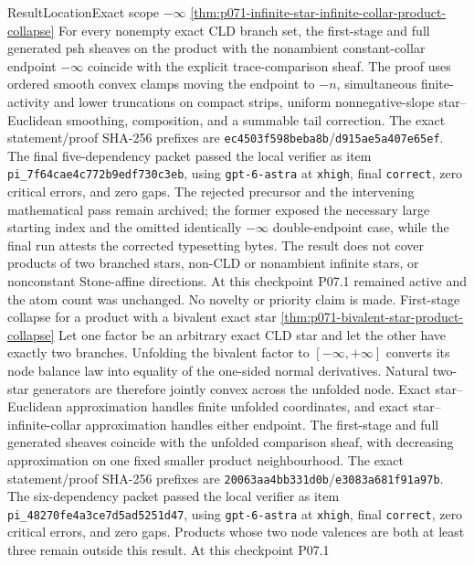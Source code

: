 \begin{AppLProvenanceLedger}{Result}{Location}{Exact scope}
{   \(-\infty\)}
  {\cref{thm:p071-infinite-star-infinite-collar-product-collapse}}
  {For every nonempty exact CLD branch set, the first-stage and full
   generated psh sheaves on the product with the nonambient
   constant-collar endpoint \(-\infty\) coincide with the explicit
   trace-comparison sheaf.  The proof uses ordered smooth convex clamps
   moving the endpoint to \(-n\), simultaneous finite-activity and lower
   truncations on compact strips, uniform nonnegative-slope
   star--Euclidean smoothing, composition, and a summable tail correction.
   The exact statement/proof SHA-256 prefixes are
   \texttt{ec4503f598beba8b}/\texttt{d915ae5a407e65ef}.  The final
   five-dependency packet passed the local verifier as item
   \nolinkurl{pi_7f64cae4c772b9edf730c3eb}, using
   \texttt{gpt-6-astra} at \texttt{xhigh}, final \texttt{correct}, zero
   critical errors, and zero gaps.  The rejected precursor and the
   intervening mathematical pass remain archived; the former exposed the
   necessary large starting index and the omitted identically \(-\infty\)
   double-endpoint case, while the final run attests the corrected
   typesetting bytes.  The result does not cover
   products of two branched stars, non-CLD or nonambient infinite stars, or
   nonconstant Stone-affine directions. At this checkpoint P07.1 remained
   active and the atom count was unchanged. No novelty or priority claim is made.}
\AppLProvenanceRecord
  {First-stage collapse for a product with a bivalent exact star}
  {\cref{thm:p071-bivalent-star-product-collapse}}
  {Let one factor be an arbitrary exact CLD star and let the other have
   exactly two branches.  Unfolding the bivalent factor to
   \([-\infty,+\infty]\) converts its node balance law into equality of the
   one-sided normal derivatives.  Natural two-star generators are therefore
   jointly convex across the unfolded node.  Exact star--Euclidean
   approximation handles finite unfolded coordinates, and exact
   star--infinite-collar approximation handles either endpoint.  The
   first-stage and full generated sheaves coincide with the unfolded
   comparison sheaf, with decreasing approximation on one fixed smaller
   product neighbourhood.  The exact statement/proof SHA-256 prefixes are
   \texttt{20063aa4bb331d0b}/\texttt{e3083a681f91a97b}.  The
   six-dependency packet passed the local verifier as item
   \nolinkurl{pi_48270fe4a3ce7d5ad5251d47}, using
   \texttt{gpt-6-astra} at \texttt{xhigh}, final \texttt{correct}, zero
   critical errors, and zero gaps.  Products whose two node valences are
   both at least three remain outside this result. At this checkpoint P07.1
}
\end{AppLProvenanceLedger}
